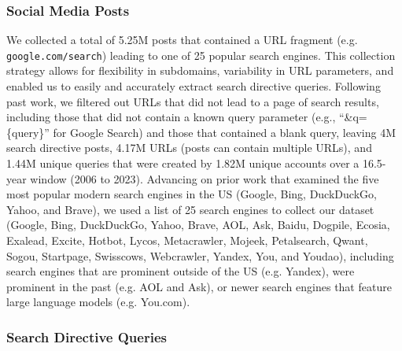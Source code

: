 \subsubsection{Social Media Posts}
\label{sec:methods-directives-posts}

We collected a total of 5.25M posts that contained a URL fragment (e.g. \nolinkurl{google.com/search}) leading to one of 25 popular search engines. 
This collection strategy allows for flexibility in subdomains, variability in URL parameters, and enabled us to easily and accurately extract search directive queries.
Following past work, we filtered out URLs that did not lead to a page of search results, including those that did not contain a known query parameter (e.g., ``\&q=\{query\}'' for Google Search) and those that contained a blank query, leaving 4M search directive posts, 4.17M URLs (posts can contain multiple URLs), and 1.44M unique queries that were created by 1.82M unique accounts over a 16.5-year window (2006 to 2023). 
Advancing on prior work that examined the five most popular modern search engines in the US (Google, Bing, DuckDuckGo, Yahoo, and Brave), we used a list of 25 search engines to collect our dataset (Google, Bing, DuckDuckGo, Yahoo, Brave, AOL, Ask, Baidu, Dogpile, Ecosia, Exalead, Excite, Hotbot, Lycos, Metacrawler, Mojeek, Petalsearch, Qwant, Sogou, Startpage, Swisscows, Webcrawler, Yandex, You, and Youdao), including search engines that are prominent outside of the US (e.g. Yandex), were prominent in the past (e.g. AOL and Ask), or newer search engines that feature large language models (e.g. You.com).

\subsubsection{Search Directive Queries}
\label{sec:methods-directives-queries}

